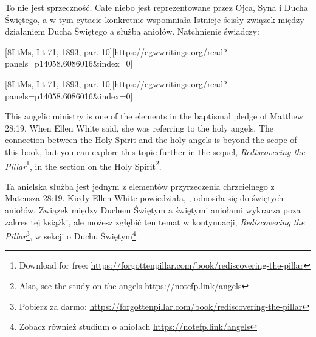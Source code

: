 To nie jest sprzeczność. Całe niebo jest reprezentowane przez Ojca, Syna i Ducha Świętego, a w tym cytacie konkretnie wspomniała  Istnieje ścisły związek między działaniem Ducha Świętego a służbą aniołów. Natchnienie świadczy:


[8LtMs, Lt 71, 1893, par. 10][https://egwwritings.org/read?panels=p14058.6086016&index=0]


[8LtMs, Lt 71, 1893, par. 10][https://egwwritings.org/read?panels=p14058.6086016&index=0]


This angelic ministry is one of the elements in the baptismal pledge of Matthew 28:19. When Ellen White said,  she was referring to the holy angels. The connection between the Holy Spirit and the holy angels is beyond the scope of this book, but you can explore this topic further in the sequel, \textit{Rediscovering the Pillar}\footnote{Download for free: \href{https://forgottenpillar.com/book/rediscovering-the-pillar}{https://forgottenpillar.com/book/rediscovering-the-pillar}}, in the section on the Holy Spirit\footnote{Also, see the study on the angels \href{https://notefp.link/angels}{https://notefp.link/angels}}.


Ta anielska służba jest jednym z elementów przyrzeczenia chrzcielnego z Mateusza 28:19. Kiedy Ellen White powiedziała, , odnosiła się do świętych aniołów. Związek między Duchem Świętym a świętymi aniołami wykracza poza zakres tej książki, ale możesz zgłębić ten temat w kontynuacji, \textit{Rediscovering the Pillar}\footnote{Pobierz za darmo: \href{https://forgottenpillar.com/book/rediscovering-the-pillar}{https://forgottenpillar.com/book/rediscovering-the-pillar}}, w sekcji o Duchu Świętym\footnote{Zobacz również studium o aniołach \href{https://notefp.link/angels}{https://notefp.link/angels}}.



% 